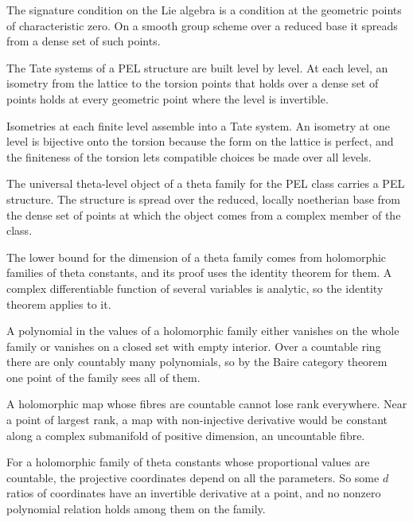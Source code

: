 The signature condition on the Lie algebra is a condition at the geometric points of characteristic zero. On a smooth
group scheme over a reduced base it spreads from a dense set of such points.

The Tate systems of a PEL structure are built level by level. At each level, an isometry from the lattice to the torsion
points that holds over a dense set of points holds at every geometric point where the level is invertible.

Isometries at each finite level assemble into a Tate system. An isometry at one level is bijective onto the torsion
because the form on the lattice is perfect, and the finiteness of the torsion lets compatible choices be made over all
levels.

The universal theta-level object of a theta family for the PEL class carries a PEL structure. The
structure is spread over the reduced, locally noetherian base from the dense set of points at which the
object comes from a complex member of the class.

The lower bound for the dimension of a theta family comes from holomorphic families of theta constants, and its
proof uses the identity theorem for them. A complex differentiable function of several variables is analytic, so the
identity theorem applies to it.

A polynomial in the values of a holomorphic family either vanishes on the whole family or vanishes on a closed set
with empty interior. Over a countable ring there are only countably many polynomials, so by the Baire category theorem
one point of the family sees all of them.

A holomorphic map whose fibres are countable cannot lose rank everywhere. Near a point of largest rank, a map with
non-injective derivative would be constant along a complex submanifold of positive dimension, an uncountable fibre.

For a holomorphic family of theta constants whose proportional values are countable, the projective coordinates
depend on all the parameters. So some $d$ ratios of coordinates have an invertible derivative at a point, and no
nonzero polynomial relation holds among them on the family.

